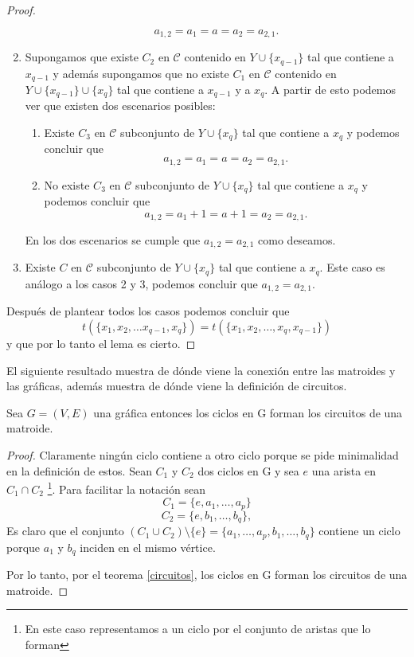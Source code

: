 \begin{proof}
\begin{enumerate}
$$a_{1,2}=a_1 =a=a_2 = a_{2,1}.$$
\item Supongamos que existe $C_2$ en $\mathcal{C}$ contenido en $Y \cup \{ x_{q-1}\}$ tal que contiene a $x_{q-1}$ y además supongamos que no existe $C_1$ en $\mathcal{C}$ contenido en $Y \cup \{ x_{q-1}\} \cup \{x_q\}$ tal que contiene a $x_{q-1}$ y a $x_q$. A partir de esto podemos ver que existen dos escenarios posibles: 
\begin{enumerate}
\item Existe $C_3$ en $\mathcal{C}$ subconjunto de $Y \cup \{ x_{q}\}$ tal que contiene a $x_{q}$ y podemos concluir que 
$$a_{1,2}=a_1 =a=a_2 = a_{2,1}.$$
\item No existe $C_3$ en $\mathcal{C}$ subconjunto de $Y \cup \{ x_{q}\}$ tal que contiene a $x_{q}$ y podemos concluir que 
$$a_{1,2}=a_1 +1 = a + 1= a_2 = a_{2,1}.$$
\end{enumerate}
En los dos escenarios se cumple que $a_{1,2}=a_{2,1}$ como deseamos. 
\item Existe $C$ en $\mathcal{C}$ subconjunto de $Y \cup \{x_q\}$ tal que contiene a $x_q$. Este caso es análogo a los casos 2 y 3, podemos concluir que $a_{1,2}=a_{2,1}$. 
\end{enumerate}
Después de plantear todos los casos podemos concluir que $$t(\{x_1,x_2,\dots x_{q-1},x_q\}) = t(\{x_1,x_2,\dots,x_q,x_{q-1}\}) $$ y que por lo tanto el lema es cierto.
\end{proof}


El siguiente resultado muestra de dónde viene la conexión entre las matroides y las gráficas, además muestra de dónde viene la definición de circuitos.

\begin{teo}
Sea $G=(V,E)$ una gráfica entonces los ciclos en G forman los circuitos de una matroide. 
\end{teo}
\begin{proof}
Claramente ningún ciclo contiene a otro ciclo porque se pide minimalidad en la definición de estos. Sean $C_1$ y $C_2$ dos ciclos en G y sea $e$ una arista en $C_1 \cap C_2$ \footnote{En este caso representamos a un ciclo por el conjunto de aristas que lo forman}. Para facilitar la notación sean 
$$C_1 = \{ e, a_1, \dots, a_p\} $$
$$C_2 = \{e,b_1,\dots, b_q \},$$
Es claro que el conjunto $(C_1 \cup C_2) \setminus \{e\}= \{ a_1, \dots, a_p, b_1,\dots, b_q\}$ contiene un ciclo porque $a_1$ y $b_q$ inciden en el mismo vértice. 

Por lo tanto, por el teorema \ref{circuitos}, los ciclos en G forman los circuitos de una matroide.
\end{proof}

